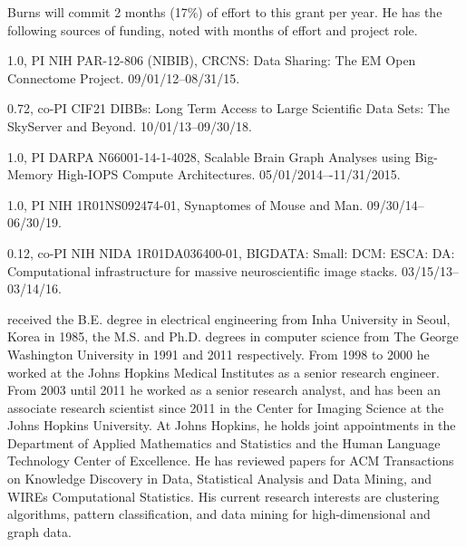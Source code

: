 \vspace{10pt}
  Burns will commit 2 months (17\%) of effort to this grant per year.  He has the following sources of funding, noted with months of effort and project role.
\small
\vspace{-5pt}
\begin{list}{[]}{\settowidth{\labelwidth}{0.72 mos., co-PI}\leftmargin{}\advance\leftmargin 0.2in \setlength{\labelsep}{0.2in}}
\addtolength{\itemsep}{-4pt}

\item[1.0, PI] NIH PAR-12-806 (NIBIB), CRCNS: Data Sharing: The EM Open Connectome Project. 
09/01/12--08/31/15.

\item[0.72, co-PI] CIF21 DIBBs: Long Term Access to Large Scientific Data Sets: The SkyServer and Beyond. 10/01/13--09/30/18.

\item[1.0, PI] DARPA N66001-14-1-4028, Scalable Brain Graph Analyses using Big-Memory High-IOPS Compute Architectures. 05/01/2014–-11/31/2015.

\item[1.0, PI] NIH 1R01NS092474-01, Synaptomes of Mouse and Man.  09/30/14--06/30/19.

\item[0.12, co-PI] NIH NIDA 1R01DA036400-01, BIGDATA: Small: DCM: ESCA: DA: Computational infrastructure for massive neuroscientific image stacks. 03/15/13--03/14/16.

\end{list}



 received the B.E. degree in electrical engineering from Inha University in Seoul, Korea in 1985, the M.S. and Ph.D. degrees in computer science from The George Washington University in 1991 and 2011 respectively. From 1998 to 2000 he worked at the Johns Hopkins Medical Institutes as a senior research engineer. From 2003 until 2011 he worked as a senior research analyst, and has been an associate research scientist since 2011 in the Center for Imaging Science at the Johns Hopkins University. At Johns Hopkins, he holds joint appointments in the Department of Applied Mathematics and Statistics and the Human Language Technology Center of Excellence.
% 
He has reviewed papers for ACM Transactions on Knowledge Discovery in Data, Statistical Analysis and Data Mining, and WIREs Computational Statistics. His current research interests are clustering algorithms, pattern classification, and data mining for high-dimensional and graph data.


